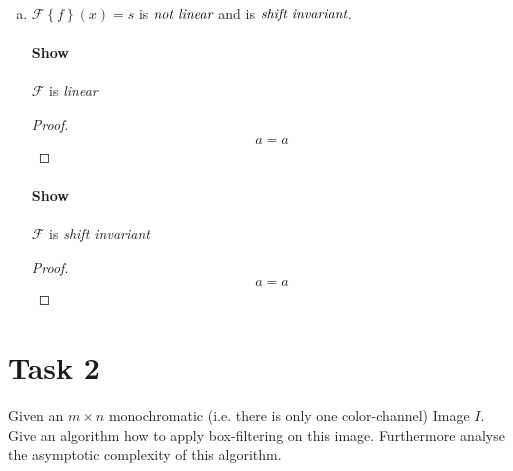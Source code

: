 \documentclass{paper}
\begin{document}
\begin{enumerate}[(a)]
\paragraph{Show} $\mathcal{F}$ is \emph{linear} \\
\begin{proof}
\begin{align*}
    a = a
\end{align*}
\end{proof}

\paragraph{Show} $\mathcal{F}$ is \emph{shift invariant} \\
\begin{proof}
\begin{align*}
    a = a
\end{align*}
\end{proof}

\item $\mathcal{F} \left \{ f \right\} (x) = s$ is $\emph{not linear}$ and is $\emph{shift invariant}$.

\paragraph{Show} $\mathcal{F}$ is \emph{linear} \\
\begin{proof}
\begin{align*}
    a = a
\end{align*}
\end{proof}

\paragraph{Show} $\mathcal{F}$ is \emph{shift invariant} \\
\begin{proof}
\begin{align*}
    a = a
\end{align*}
\end{proof}


\end{enumerate}

    
\section*{Task 2}

Given an $m \times n$ monochromatic (i.e. there is only one color-channel) Image $I$. 
Give an algorithm how to apply box-filtering on this image. Furthermore analyse the asymptotic complexity of this algorithm.
\end{document}
